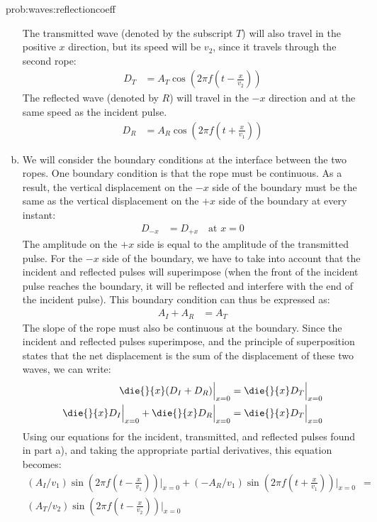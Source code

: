 \begin{solution}{prob:waves:reflectioncoeff}
\begin{enumerate}[(a)]
The transmitted wave (denoted by the subscript $T$) will also travel in the positive $x$ direction, but its speed will be $v_2$, since it travels through the second rope:
\begin{align*}
D_T&=A_T\cos \left( 2\pi f\left(t-\frac{x}{v_2}\right)\right)
\end{align*}
The reflected wave (denoted by $R$) will travel in the $-x$ direction and at the same speed as the incident pulse.
\begin{align*}
D_R&=A_R\cos \left( 2\pi f\left(t+\frac{x}{v_1}\right)\right)
\end{align*}
\item We will consider the boundary conditions at the interface between the two ropes. One boundary condition is that the rope must be continuous. As a result, the vertical displacement on the $-x$ side of the boundary must be the same as the vertical displacement on the $+x$ side of the boundary at every instant: 
\begin{align*}
D_{-x}&=D_{+x}\quad\text{at $x=0$}
\end{align*}
The amplitude on the $+x$ side is equal to the amplitude of the transmitted pulse. For the $-x$ side of the boundary, we have to take into account that the incident and reflected pulses will superimpose (when the front of the incident pulse reaches the boundary, it will be reflected and interfere with the end of the incident pulse). This boundary condition can thus be expressed as:
\begin{align*}
A_I+A_R&=A_T
\end{align*}
The slope of the rope must also be continuous at the boundary. Since the incident and reflected pulses superimpose, and the principle of superposition states that the net displacement is the sum of the displacement of these two waves, we can write:
\begin{align*}
\die{}{x}(D_I+D_R)\Bigr|_{x=0}&=\die{}{x}D_T\Bigr|_{x=0}\\
\die{}{x}D_I\Bigr|_{x=0}+\die{}{x}D_R\Bigr|_{x=0}&=\die{}{x}D_T\Bigr|_{x=0}
\end{align*}
Using our equations for the incident, transmitted, and reflected pulses found in part a), and taking the appropriate partial derivatives, this equation becomes:
\begin{align*}
(A_I/v_1) \sin \left(2\pi f\left( t-\frac{x}{v_1}\right)\right)\Bigr|_{x=0}+(-A_R/v_1) \sin \left( 2\pi f\left( t+\frac{x}{v_1}\right)\right)\Bigr|_{x=0}&=\\(A_T/v_2) \sin \left( 2\pi f\left( t-\frac{x}{v_2}\right)\right)\Bigr|_{x=0}

\end{align*}
\end{enumerate}
\end{solution}
